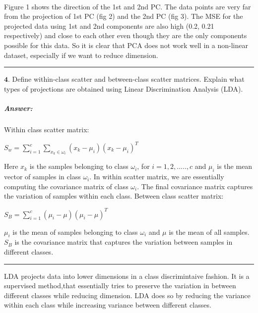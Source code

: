 \documentclass[11pt]{article}
\begin{document}
    \begin{center}
    \end{center}
    { \hspace*{\fill} \\}

    Figure 1 shows the direction of the 1st and 2nd PC. The data points are
very far from the projection of 1st PC (fig 2) and the 2nd PC (fig 3).
The MSE for the projected data using 1st and 2nd components are also
high (0.2, 0.21 respectively) and close to each other even though they
are the only components possible for this data. So it is clear that PCA
does not work well in a non-linear dataset, especially if we want to
reduce dimension.

    \begin{center}\rule{0.5\linewidth}{\linethickness}\end{center}

\(\textbf{4.}\) Define within-class scatter and between-class scatter
matrices. Explain what types of projections are obtained using Linear
Discrimination Analysis (LDA).

    \hypertarget{answer}{%
\subparagraph{Answer:}\label{answer}}

Within class scatter matrix:

\(S_w = \sum_{i=1}^c \sum_{x_k \in {\omega_i}} (x_k - \mu_i)(x_k - \mu_i)^T\)

Here \(x_k\) is the samples belonging to class \(\omega_i\), for
\(i=1, 2, ....., c\) and \(\mu_i\) is the mean vector of samples in
class \(\omega_i\). In within scatter matrix, we are essentially
computing the covariance matrix of class \(\omega_i\). The final
covariance matrix captures the variation of samples within each class.
\newpage
Between class scatter matrix:

\(S_B = \sum_{i=1}^c (\mu_i - \mu)(\mu_i- \mu)^T\)

\(\mu_i\) is the mean of samples belonging to class \(\omega_i\) and
\(\mu\) is the mean of all samples. \(S_B\) is the covariance matrix
that captures the variation between samples in different classes.

\begin{center}\rule{0.5\linewidth}{\linethickness}\end{center}

LDA projects data into lower dimensions in a class discrimintaive
fashion. It is a supervised method,that essentially tries to preserve
the variation in between different classes while reducing dimension. LDA
does so by reducing the variance within each class while increasing
variance between different classes.
\end{document}
